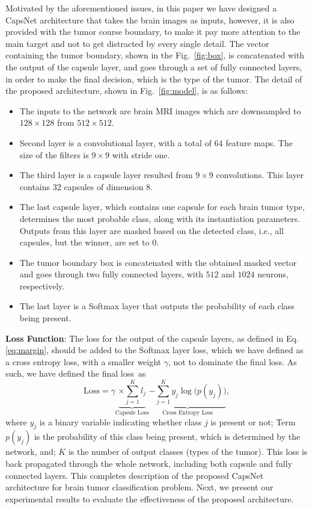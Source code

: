 \documentclass{article}
\begin{document}
Motivated by the aforementioned issues, in this paper we have designed a CapsNet architecture that takes the brain images as inputs, however, it is also provided with the tumor course boundary, to make it pay more attention to the main target and not to get distracted by every single detail. The vector containing the tumor boundary, shown in the Fig.~\ref{fig:box}, is concatenated with the output of the capsule layer, and goes through a set of fully connected layers, in order to make the final decision, which is the type of the tumor. The detail of the proposed architecture, shown in Fig.~\ref{fig:model}, is as follows:
%
\begin{itemize}
\item The inputs to the network are brain MRI images which are downsampled to $128 \times 128$ from $512 \times 512$.
\vspace{-.0125in}
\item Second layer is a convolutional layer, with a total of $64$ feature maps. The size of the filters is $9 \times 9$ with stride one.
\vspace{-.0125in}
\item The third layer is a capsule layer resulted from $9 \times 9$ convolutions. This layer contains $32$ capsules of dimension $8$.
\vspace{-.0125in}
\item The last capsule layer, which contains one capsule for each brain tumor type, determines the most probable class, along with its instantiation parameters. Outputs from this layer are masked based on the detected class, i.e., all capsules, but the winner, are set to $0$.
\vspace{-.0125in}
\item The tumor boundary box is concatenated with the obtained masked vector and goes through two fully connected layers, with $512$ and $1024$ neurons, respectively.
\vspace{-.0125in}
\item The last layer is a Softmax layer that outputs the probability of each class being present.
\end{itemize}
%
\textbf{Loss Function}: The loss for the output of the capsule layers, as defined in Eq. \eqref{eq:margin}, should be added to the Softmax layer loss, which we have defined as a cross entropy loss, with a smaller weight $\gamma$, not to dominate the final loss. As such, we have defined the final loss~as
%
\begin{equation}
\label{eq:fin}
\text{Loss} = \gamma\underbrace{\times \sum_{j=1}^{K}l_j}_{\text{Capsule Loss}}  \underbrace{-\sum_{j=1}^{K}y_j \log\big(p(y_j)\big)}_{\text{Cross Entropy Loss}},
\end{equation}
%
where $y_j$ is a binary variable indicating whether class $j$ is present or not; Term $p(y_j)$ is the probability of this class being present, which is determined by the network, and; $K$ is the number of output classes (types of the tumor). This loss is back propagated through the whole network, including both capsule and fully connected layers.  This completes description of the proposed CapsNet architecture for brain tumor classification problem. Next, we present our experimental results to evaluate the  effectiveness of the proposed architecture.
\end{document}
